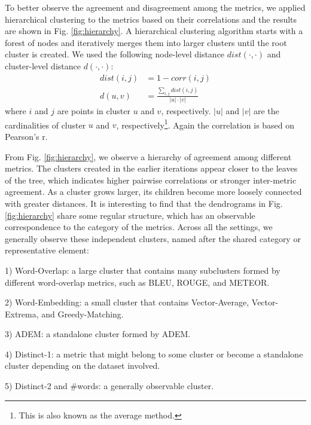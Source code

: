 \documentclass[runningheads]{llncs}
\begin{document}
    To better observe the agreement and disagreement among the metrics, we applied hierarchical clustering to the metrics based on their correlations and the results are shown in Fig. \ref{fig:hierarchy}. A hierarchical clustering algorithm starts with a forest of nodes and iteratively merges them into larger clusters until the root cluster is created. We used the following node-level distance $\textit{dist}(\cdot, \cdot)$ and cluster-level distance $d(\cdot, \cdot)$:
    \begin{align}
        \textit{dist}(i, j) &= 1 - \textit{corr}(i, j) \\
        d(u, v) &= \frac{\sum_{i,j}\textit{dist}(i, j)}{|u| \cdot |v|}
    \end{align}
    where $i$ and $j$ are points in cluster $u$ and $v$, respectively. $|u|$ and $|v|$ are the cardinalities of cluster $u$ and $v$, respectively\footnote{This is also known as the average method.}. Again the correlation is based on Pearson's r.
    

    From Fig. \ref{fig:hierarchy}, we observe a hierarchy of agreement among different metrics. The clusters created in the earlier iterations appear closer to the leaves of the tree, which indicates higher pairwise correlations or stronger inter-metric agreement. As a cluster grows larger, its children become more loosely connected with greater distances. It is interesting to find that the dendrograms in Fig. \ref{fig:hierarchy} share some regular structure, which has an observable correspondence to the category of the metrics. Across all the settings, we generally observe these independent clusters, named after the shared category or representative element:

    1) Word-Overlap: a large cluster that contains many subclusters formed by different word-overlap metrics, such as BLEU, ROUGE, and METEOR.

    2) Word-Embedding: a small cluster that contains Vector-Average, Vector-Extrema, and Greedy-Matching.

    3) ADEM: a standalone cluster formed by ADEM.

    4) Distinct-1: a metric that might belong to some cluster or become a standalone cluster depending on the dataset involved.

    5) Distinct-2 and \#words: a generally observable cluster.
\end{document}
